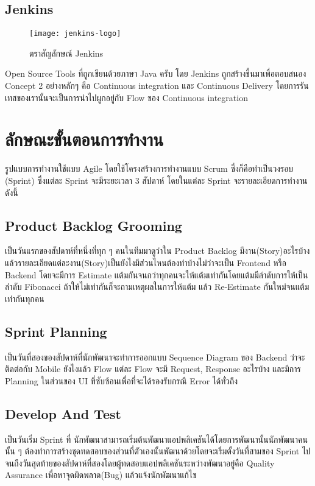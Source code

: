     \subsection{Jenkins}
    \begin{figure}[H]
        \centering
        \texttt{[image: jenkins-logo]}
        \caption{ตราสัญลักษณ์ Jenkins}\label{jenkins-logo}
    \end{figure}
    Open Source Tools ที่ถูกเขียนด้วยภาษา Java ครับ โดย Jenkins ถูกสร้างขึ้นมาเพื่อตอบสนอง Concept 2 อย่างหลักๆ คือ 
    Continuous integration และ Continuous Delivery โดยการรันเทสของเรานั้นจะเป็นการนำไปผูกอยู่กับ Flow ของ Continuous integration\cite{jenkins}

\section{ลักษณะขั้นตอนการทำงาน}
รูปแบบการทำงานใช้แบบ Agile โดยใช้โครงสร้างการทำงานแบบ Scrum ซึ่งก็คือทำเป็นวงรอบ (Sprint) ซึ่งแต่ละ Sprint จะมีระยะเวลา 3 สัปดาห์ โดยในแต่ละ Sprint จะรายละเอียดการทำงานดังนี้
\subsection{Product Backlog Grooming}
เป็นวันแรกของสัปดาห์ที่หนึ่งที่ทุก ๆ คนในทีมมาดูว่าใน Product Backlog มีงาน(Story)อะไรบ้างแล้วรายละเอียดแต่ละงาน(Story)เป็นยังไงมีส่วนไหนต้องทำบ้างไม่ว่าจะเป็น Frontend หรือ Backend โดยจะมีการ Estimate แต้มกันจนกว่าทุกคนจะให้แต้มเท่ากันโดยแต้มมีลำดับการให้เป็นลำดับ Fibonacci ถ้าให้ไม่เท่ากันก็จะถามเหตุผลในการให้แต้ม แล้ว Re-Estimate กันใหม่จนแต้มเท่ากันทุกคน

    \subsection{Sprint Planning}
    เป็นวันที่สองของสัปดาห์ที่นักพัฒนาจะทำการออกแบบ Sequence Diagram ของ Backend ว่าจะติดต่อกับ Mobile ยังไงแล้ว Flow แต่ละ Flow จะมี Request, Response อะไรบ้าง และมีการ Planning ในส่วนของ UI ที่ซับซ้อนเพื่อที่จะได้รองรับกรณี Error ได้ทั่วถึง 
        
    \subsection{Develop And Test}
    เป็นวันเริ่ม Sprint ที่ นักพัฒนาสามารถเริ่มต้นพัฒนาแอปพลิเคชันได้โดยการพัฒนานั้นนักพัฒนาคนนั้น ๆ ต้องทำการสร้างชุดทดสอบของส่วนที่ตัวเองนั้นพัฒนาด้วยโดยจะเริ่มตั้งวันที่สามของ Sprint ไปจนถึงวันสุดท้ายของสัปดาห์ที่สองโดยผู้ทดสอบแอปพลิเคชันระหว่างพัฒนาอยู่คือ Quality Assurance เพื่อหาจุดผิดพลาด(Bug) แล้วแจ้งนักพัฒนาแก้ไข

